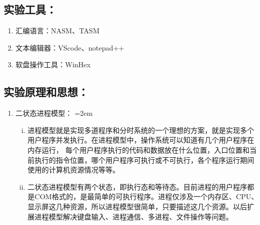 \documentclass[UTF8]{article}
\begin{document}
\subsection{实验工具：}
\begin{enumerate}[1)]%
\heiti\setlength{\itemsep}{0em}
	\item 汇编语言：NASM、TASM
	\item 文本编辑器：VScode、notepad++
	\item 软盘操作工具：WinHex
\end{enumerate}

\subsection{实验原理和思想：}
\begin{enumerate}[1)]
\heiti
	\item 二状态进程模型：
	\parindent=2em
		\begin{enumerate}[i)]
		\heiti \setlength{\itemsep}{0.2ex}
			\item 进程模型就是实现多道程序和分时系统的一个理想的方案，就是实现多个用户程序并发执行。在进程模型中，操作系统可以知道有几个用户程序在内存运行，
每个用户程序执行的代码和数据放在什么位置，入口位置和当前执行的指令位置，哪个用户程序可执行或不可执行，各个程序运行期间使用的计算机资源情况等等。
			\item 二状态进程模型有两个状态，即执行态和等待态。目前进程的用户程序都是COM格式的，是最简单的可执行程序。进程仅涉及一个内存区、CPU、显示屏这几种资源，所以进程模型很简单，只要描述这几个资源。以后扩展进程模型解决键盘输入、进程通信、多进程、文件操作等问题。
		\end{enumerate}
		

\end{enumerate}
\end{document}
